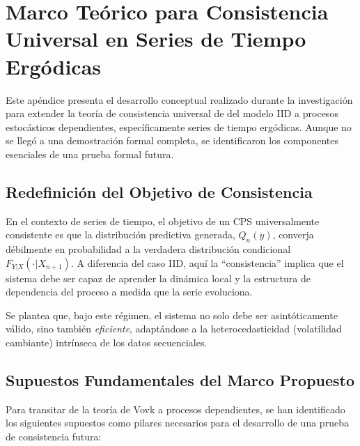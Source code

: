 \chapter{Marco Teórico para Consistencia Universal en Series de Tiempo Ergódicas}
\label{apx:consistencia_ergodica}

Este apéndice presenta el desarrollo conceptual realizado durante la investigación para extender la teoría de consistencia universal de \cite{Vovk2019} del modelo IID a procesos estocásticos dependientes, específicamente series de tiempo ergódicas. Aunque no se llegó a una demostración formal completa, se identificaron los componentes esenciales de una prueba formal futura.

\section{Redefinición del Objetivo de Consistencia}

En el contexto de series de tiempo, el objetivo de un CPS universalmente consistente es que la distribución predictiva generada, $Q_n(y)$, converja débilmente en probabilidad a la verdadera distribución condicional $F_{Y|X}(\cdot|X_{n+1})$. A diferencia del caso IID, aquí la ``consistencia'' implica que el sistema debe ser capaz de aprender la dinámica local y la estructura de dependencia del proceso a medida que la serie evoluciona.

Se plantea que, bajo este régimen, el sistema no solo debe ser asintóticamente válido, sino también \textit{eficiente}, adaptándose a la heterocedasticidad (volatilidad cambiante) intrínseca de los datos secuenciales.

\section{Supuestos Fundamentales del Marco Propuesto}

Para transitar de la teoría de Vovk a procesos dependientes, se han identificado los siguientes supuestos como pilares necesarios para el desarrollo de una prueba de consistencia futura:

